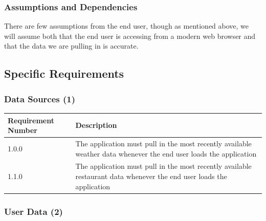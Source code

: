 \documentclass[12pt]{article}
\begin{document}
\subsubsection{Assumptions and Dependencies}

There are few assumptions from the end user, though as mentioned above, we will assume both that the end user is accessing from a modern web browser and that the data we are pulling in is accurate.

\subsection{Specific Requirements}

\subsubsection{Data Sources (1)}

\setlength{\tabcolsep}{1cm}
\begin{longtable}{|l|p{8cm}|}
    \hline
    Requirement Number & Description                                                                                                          \\

    \hline\hline
    1.0.0              & The application must pull in the most recently available weather data whenever the end user loads the application    \\

    \hline\hline
    1.1.0              & The application must pull in the most recently available restaurant data whenever the end user loads the application \\
    \hline
\end{longtable}

\subsubsection{User Data (2)}
\end{document}
